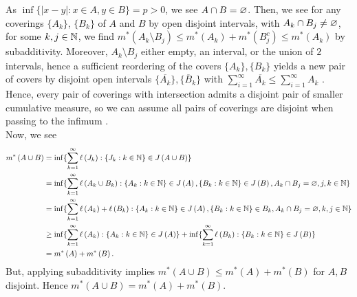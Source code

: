 \documentclass[a4paper]{article}
\begin{document}
\begin{solution}[28]
	As \(\inf \{ \left| x-y \right|  : x \in A, y \in B \} = p > 0\), we see \(A \cap B = \varnothing\). Then, we see for any coverings \(\{A_{k}\} \), \(\{B_{k}\} \) of \(A\) and \(B\) by open disjoint intervals, with \(A_{k} \cap B_{j} \neq \varnothing\), for some \(k, j \in \mathbb{N}\), we find \(m^{*}\left( A_{k} \setminus B_{j} \right)  \le m^{*}\left( A_{k} \right)  + m^{*}\left( B_{j}^{c} \right) \le m^{*}\left( A_{k}  \right)  \) by subadditivity. Moreover, \(A_{k} \setminus B_{j}\) either empty, an interval, or the union of \(2\) intervals, hence a sufficient reordering of the covers \(\{A_{k}\}, \{B_{k}\}  \) yields a new pair of covers by disjoint open intervals \(\{\overline{A_{k}}\} , \{\overline{B}_{k}\} \) with \(\sum_{i= 1}^{\infty} \overline{A_{k}} \le \sum_{i= 1}^{\infty} A_{k}\) . Hence, every pair of coverings with intersection admits a disjoint pair of smaller cumulative measure, so we can assume all pairs of coverings are disjoint when passing to the infimum .\\
	Now, we see
	\begin{align*}
		m^{*}\left( A \cup B \right) &=  \inf \{ \sum_{k= 1}^{\infty} \ell\left( J_{k} \right)  : \{J_{k} : k \in \mathbb{N}\} \in J\left( A \cup B \right)   \}  \\
					     &= \inf \{ \sum_{k= 1}^{\infty} \ell\left( A_{k} \cup B_{k} \right)  : \{A_{k} : k \in \mathbb{N}\} \in J\left( A \right) , \{B_{k} : k \in \mathbb{N}\} \in J\left( B \right) , A_{k} \cap B_{j} = \varnothing, j, k \in \mathbb{N}  \}  \\
					     &= \inf \{ \sum_{k= 1}^{\infty} \ell\left( A_{k} \right)  + \ell\left( B_{k} \right)  : \{A_{k} : k \in \mathbb{N}\} \in J\left( A \right) , \{B_{k} : k \in \mathbb{N}\} \in B_{k}, A_{k} \cap B_{j} =\varnothing, k, j \in \mathbb{N}  \}  \\
					     &\ge \inf \{ \sum_{k= 1}^{\infty} \ell\left( A_{k} \right)  : \{A_{k} : k \in \mathbb{N}\} \in J\left( A \right)   \}  + \inf \{ \sum_{k=1}^{\infty} \ell\left( B_{k} \right)  : \{B_{k} : k \in \mathbb{N}\} \in J\left( B \right)   \}\\
					     &= m^{*}\left( A \right) + m^{*}\left( B \right)
	.\end{align*}
	But, applying subadditivity implies \(m^{*}\left( A \cup B \right)  \le m^{*}\left( A \right)  + m^{*}\left( B \right) \) for \(A, B\) disjoint. Hence \(m^{*}\left( A \cup B \right)  = m^{*}\left( A \right)  + m^{*}\left( B \right) \).
\end{solution}
\newpage
\begin{solution}[29]

\end{solution}
\end{document}
